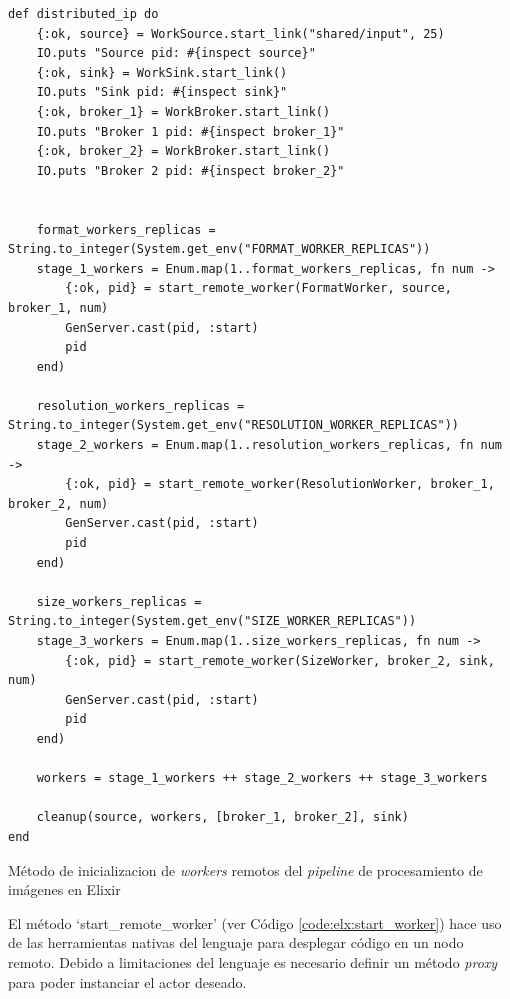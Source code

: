 \documentclass[11pt]{article}
\begin{document}
\begin{listing}[ht]
\begin{verbatim}
def distributed_ip do
    {:ok, source} = WorkSource.start_link("shared/input", 25)
    IO.puts "Source pid: #{inspect source}"
    {:ok, sink} = WorkSink.start_link()
    IO.puts "Sink pid: #{inspect sink}"
    {:ok, broker_1} = WorkBroker.start_link()
    IO.puts "Broker 1 pid: #{inspect broker_1}"
    {:ok, broker_2} = WorkBroker.start_link()
    IO.puts "Broker 2 pid: #{inspect broker_2}"
    
    
    format_workers_replicas = String.to_integer(System.get_env("FORMAT_WORKER_REPLICAS"))
    stage_1_workers = Enum.map(1..format_workers_replicas, fn num ->
        {:ok, pid} = start_remote_worker(FormatWorker, source, broker_1, num)
        GenServer.cast(pid, :start)
        pid
    end)
    
    resolution_workers_replicas = String.to_integer(System.get_env("RESOLUTION_WORKER_REPLICAS"))
    stage_2_workers = Enum.map(1..resolution_workers_replicas, fn num ->
        {:ok, pid} = start_remote_worker(ResolutionWorker, broker_1, broker_2, num)
        GenServer.cast(pid, :start)
        pid
    end)
    
    size_workers_replicas = String.to_integer(System.get_env("SIZE_WORKER_REPLICAS"))
    stage_3_workers = Enum.map(1..size_workers_replicas, fn num ->
        {:ok, pid} = start_remote_worker(SizeWorker, broker_2, sink, num)
        GenServer.cast(pid, :start)
        pid
    end)
    
    workers = stage_1_workers ++ stage_2_workers ++ stage_3_workers
    
    cleanup(source, workers, [broker_1, broker_2], sink)
end
\end{verbatim}
\caption{Método de inicializacion de \textit{workers} remotos del \textit{pipeline} de procesamiento de imágenes en Elixir}
\label{code:elx:ip}
\end{listing}

El método `start\_remote\_worker' (ver Código \ref{code:elx:start_worker}) hace uso de las herramientas nativas del lenguaje para desplegar código en un nodo remoto. Debido a limitaciones del lenguaje es necesario definir un método \textit{proxy} para poder instanciar el actor deseado.
\end{document}
